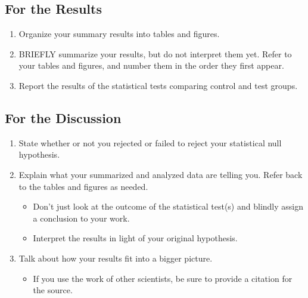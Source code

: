 \documentclass[
]{book}
\providecommand{\tightlist}{%
  \setlength{\itemsep}{0pt}\setlength{\parskip}{0pt}}
\begin{document}
\hypertarget{for-the-results}{%
\subsection*{For the Results}\label{for-the-results}}

\begin{enumerate}
\def\labelenumi{\arabic{enumi}.}
\setcounter{enumi}{5}
\item
  Organize your summary results into tables and figures.
\item
  BRIEFLY summarize your results, but do not interpret them yet. Refer to your tables and figures, and number them in the order they first appear.
\item
  Report the results of the statistical tests comparing control and test groups.
\end{enumerate}

\hypertarget{for-the-discussion}{%
\subsection*{For the Discussion}\label{for-the-discussion}}

\begin{enumerate}
\def\labelenumi{\arabic{enumi}.}
\setcounter{enumi}{8}
\item
  State whether or not you rejected or failed to reject your statistical null hypothesis.
\item
  Explain what your summarized and analyzed data are telling you. Refer back to the tables and figures as needed.

  \begin{itemize}
  \tightlist
  \item
    Don't just look at the outcome of the statistical test(s) and blindly assign a conclusion to your work.
  \item
    Interpret the results in light of your original hypothesis.
  \end{itemize}
\item
  Talk about how your results fit into a bigger picture.

  \begin{itemize}
  \tightlist
  \item
    If you use the work of other scientists, be sure to provide a citation for the source.
  \end{itemize}
\end{enumerate}
\end{document}
